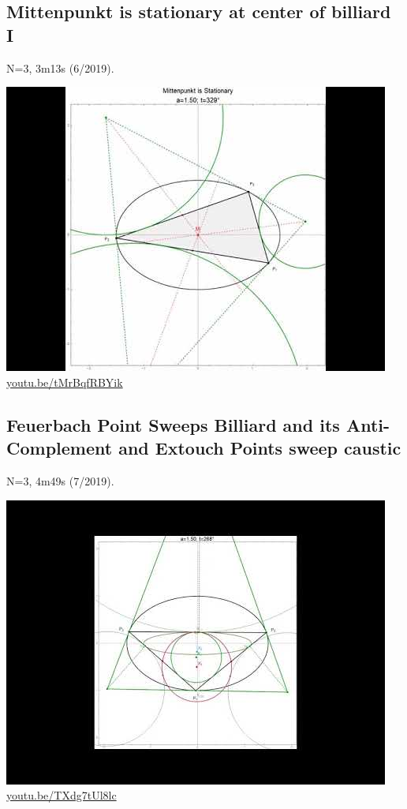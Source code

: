 \documentclass[12pt]{amsart}
\begin{document}
\subsection{Mittenpunkt is stationary at center of billiard I}
\label{vid:tMrBqfRBYik}
\noindent N=3, 3m13s (6/2019). 
\begin{center}\includegraphics[width=.5\textwidth]{pics/tMrBqfRBYik.jpg} \\ 
\href{https://youtu.be/tMrBqfRBYik}{\url{youtu.be/tMrBqfRBYik}}\end{center}
% 

\subsection{Feuerbach Point Sweeps Billiard and its Anti-Complement and Extouch Points sweep caustic}
\label{vid:TXdg7tUl8lc}
\noindent N=3, 4m49s (7/2019). 
\begin{center}\includegraphics[width=.5\textwidth]{pics/TXdg7tUl8lc.jpg} \\ 
\href{https://youtu.be/TXdg7tUl8lc}{\url{youtu.be/TXdg7tUl8lc}}\end{center}
% 
\end{document}

